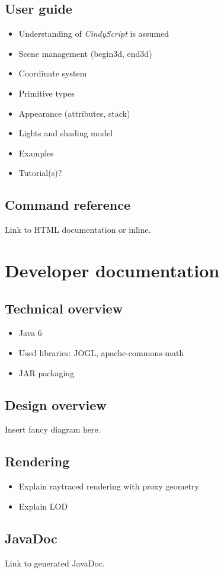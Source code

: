 \documentclass{scrartcl}
\begin{document}
\subsection{User guide}

\begin{itemize}
\item Understanding of \emph{CindyScript} is assumed
\item Scene management (begin3d, end3d)
\item Coordinate system
\item Primitive types
\item Appearance (attributes, stack)
\item Lights and shading model
\item Examples
\item Tutorial(s)?
\end{itemize}

\subsection{Command reference}

Link to HTML documentation or inline.

\section{Developer documentation}

\subsection{Technical overview}

\begin{itemize}
\item Java 6
\item Used libraries: JOGL, apache-commons-math
\item JAR packaging
\end{itemize}

\subsection{Design overview}

Insert fancy diagram here.

\subsection{Rendering}

\begin{itemize}
\item Explain raytraced rendering with proxy geometry
\item Explain LOD
\end{itemize}

\subsection{JavaDoc}

Link to generated JavaDoc.
\end{document}
